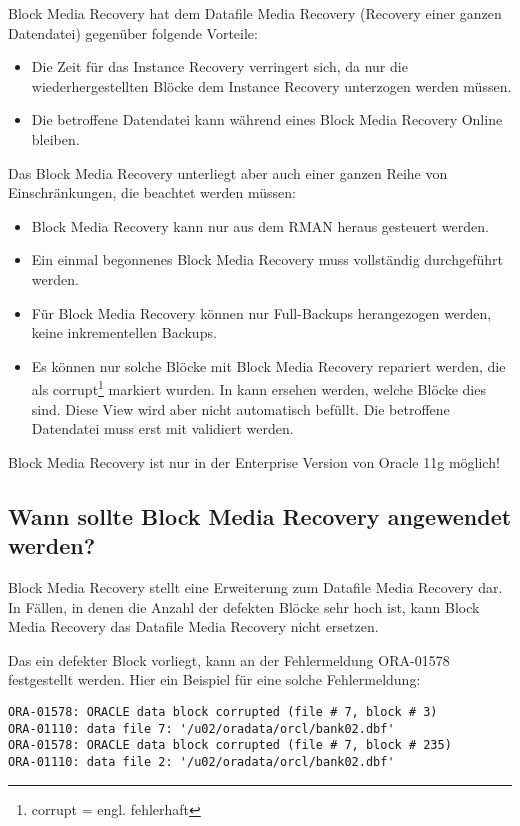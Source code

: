       Block Media Recovery hat dem Datafile Media Recovery (Recovery einer
      ganzen Datendatei) gegenüber folgende Vorteile:
      \begin{itemize}
        \item Die Zeit für das Instance Recovery verringert sich, da nur die wiederhergestellten Blöcke dem Instance Recovery unterzogen werden müssen.
        \item Die betroffene Datendatei kann während eines Block Media Recovery Online bleiben.
      \end{itemize}
      Das Block Media Recovery unterliegt aber auch einer ganzen Reihe von
      Einschränkungen, die beachtet werden müssen:
      \begin{itemize}
        \item Block Media Recovery kann nur aus dem RMAN heraus gesteuert werden.
        \item Ein einmal begonnenes Block Media Recovery muss vollständig durchgeführt werden.
				\item Für Block Media Recovery können nur Full-Backups herangezogen werden, keine inkrementellen Backups.
        \item Es können nur solche Blöcke mit Block Media Recovery repariert werden, die als corrupt\footnote{corrupt = engl. fehlerhaft} markiert wurden. In  kann ersehen werden, welche Blöcke dies sind. Diese View wird aber nicht automatisch befüllt. Die betroffene Datendatei muss erst mit  validiert werden.
      \end{itemize}
      \begin{merke}
        Block Media Recovery ist nur in der Enterprise Version von Oracle 11g möglich!
      \end{merke}
      \subsection{Wann sollte Block Media Recovery angewendet werden?}
        Block Media Recovery stellt eine Erweiterung zum Datafile Media Recovery dar. In Fällen, in denen die Anzahl der defekten Blöcke sehr hoch ist, kann Block Media Recovery das Datafile Media Recovery nicht ersetzen.

        Das ein defekter Block vorliegt, kann an der Fehlermeldung ORA-01578 festgestellt werden. Hier ein Beispiel für eine solche Fehlermeldung:
        \begin{lstlisting}[caption={Der Fehler ORA-01578},label=admin1492,language=terminal]
ORA-01578: ORACLE data block corrupted (file # 7, block # 3)
ORA-01110: data file 7: '/u02/oradata/orcl/bank02.dbf'
ORA-01578: ORACLE data block corrupted (file # 7, block # 235)
ORA-01110: data file 2: '/u02/oradata/orcl/bank02.dbf'
        \end{lstlisting}
